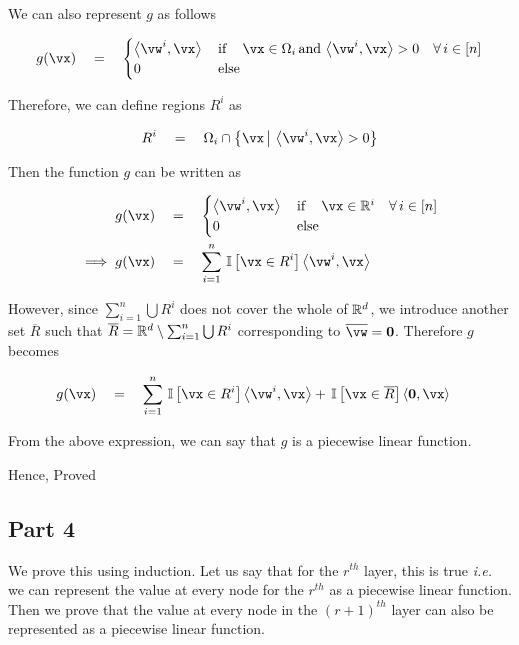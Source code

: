 \documentclass{article}
\begin{document}
\begin{mlsolution}
\begin{addmargin}{1.5em}
		We can also represent $g$ as follows

		\begin{align*}
			g(\vx)	\eq	\begin{cases}
				\ip{\vw^i}{\vx}	&	\mt{if}\quad \vx \in \Omega_i \mt{and} \ip{\vw^i}{\vx} > 0 \quad \forall\, i \in [n] \\
				0				&	\mt{else}
			\end{cases}
		\end{align*}

		Therefore, we can define regions $R^i$ as

		\begin{align*}
			R^i	\eq	\Omega_i \cap \set{\vx \pipe \ip{\vw^i}{\vx} > 0}
		\end{align*}

		Then the function $g$ can be written as

		\begin{align*}
			g(\vx)	&\eq	\begin{cases}
				\ip{\vw^i}{\vx}	&	\mt{if}\quad \vx \in \R^i \quad\forall\, i \in [n] \\
				0				&	\mt{else}
			\end{cases} \\
			\implies g(\vx)	&\eq	\sum_{i = 1}^n \is{\vx \in R^i} \ip{\vw^i}{\vx}
		\end{align*}

		However, since $\sum_{i = 1}^n \bigcup R^i$ does not cover the whole of $\mathbb{R}^d$, we introduce another set $\overline{R}$ such that $\overline{R} = \mathbb{R}^d \setminus \sum_{i = 1}^n \bigcup R^i$ corresponding to $\overline{\vw} = \vzero$. Therefore $g$ becomes

		\begin{align*}
			g(\vx)	&\eq	\sum_{i = 1}^n \is{\vx \in R^i} \ip{\vw^i}{\vx} + \is{\vx \in \overline{R}} \ip{\vzero}{\vx}
		\end{align*}

		From the above expression, we can say that $g$ is a piecewise linear function. \br%

		Hence, Proved

	\end{addmargin}

	\subsection*{Part 4}
	\begin{addmargin}{1.5em}

		We prove this using induction. Let us say that for the $r^{th}$ layer, this is true \textit{i.e.} we can represent the value at every node for the $r^{th}$ as a piecewise linear function. Then we prove that the value at every node in the $(r + 1)^{th}$ layer can also be represented as a piecewise linear function. \br%


\end{addmargin}
\end{mlsolution}
\end{document}
